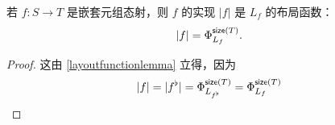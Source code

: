 \begin{lemma} \label{nestedlayoutfunctionlemma}
    若 $f:S \to T$ 是嵌套元组态射，则 $f$ 的实现 $|f|$ 是 $L_f$ 的布局函数：
    \[
    |f| =
    \Phi_{L_f}^{\mathsf{size}(T)}.
    \]
\end{lemma}

\begin{proof}
这由 \ref{layoutfunctionlemma} 立得，因为
\[
|f| = |f^\flat| = \Phi_{L_{f^\flat}}^{\mathsf{size}(T)} = \Phi_{L_f}^{\mathsf{size}(T)}
\]
\end{proof}

\newpage
